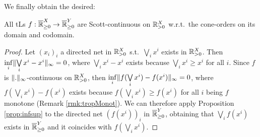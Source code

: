 
We finally obtain the desired:

\begin{theorem}
 All tLs $f:\overline{\mathbb{R}}^X_{\geq 0}\to\overline{\mathbb{R}}^Y_{\geq 0}$ are Scott-continuous on $\mathbb{R}^X_{> 0}$ w.r.t.\ the cone-orders on its domain and codomain.
\end{theorem}
\begin{proof}
 Let $(x_i)_i$ a directed net in $\mathbb{R}^X_{> 0}$ s.t.\ $\bigvee\limits_i x^i$ exists in $\mathbb{R}^X_{> 0}$.
 Then $\inf\limits_i \lVert\bigvee\limits_i x^i - x^i\rVert_\infty =0$, where $\bigvee\limits_i x^i - x^i$ exists because $\bigvee\limits_i x^i \geq x^i$ for all $i$.
 Since $f$ is $\lVert.\rVert_\infty$-continuous on $\mathbb{R}^X_{> 0}$, then $\inf\limits_i \lVert f(\bigvee\limits_i x^i) - f(x^i)\rVert_\infty =0$, where $f(\bigvee\limits_i x^i) - f(x^i)$ exists because $f(\bigvee\limits_i x^i) \geq f(x^i)$ for all $i$ being $f$ monotone (Remark \ref{rmk:tropMonot}).
 We can therefore apply Proposition \ref{prop:infsup} to the directed net $(f(x^i))_i$ in $\overline{\mathbb{R}}^Y_{\geq 0}$, obtaining that $\bigvee\limits_i f(x^i)$ exists in $\overline{\mathbb{R}}^Y_{\geq 0}$ and it coincides with $f(\bigvee\limits_i x^i)$.
\end{proof}


